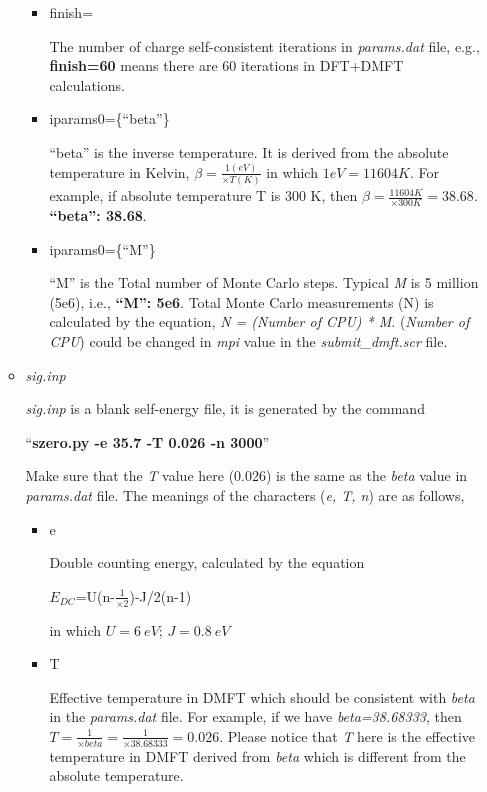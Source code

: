 \documentclass[12 pt]{article}
\begin{document}
\begin{itemize}[leftmargin=0.2in]
\begin{itemize}
	      \begin{itemize}

	      \item finish=

  The number of charge self-consistent iterations in \emph{params.dat} file, e.g., \textbf{finish=60} means there are
 60 iterations in DFT+DMFT calculations. 

	      \item iparams0=\{``beta''\}

  ``beta'' is the inverse temperature. It is derived from the absolute temperature in Kelvin, $\beta=\frac{1(eV)}
{×T(K)}$ in which $1eV=11604K$. For example, if absolute temperature T is 300 K, then $\beta=\frac{11604K}{×300K}=
38.68$. \textbf{``beta'': 38.68}.

	      \item iparams0=\{``M''\}

  ``M'' is the Total number of Monte Carlo steps. Typical \emph{M} is 5 million (5e6), i.e., \textbf{``M'': 5e6}. 
Total Monte Carlo measurements (N) is calculated by the equation, \emph{N = (Number of CPU) * M}. (\emph{Number of 
CPU}) could be changed in \emph{mpi} value in the \emph{submit\_dmft.scr} file.

	      \end{itemize}

  \cleardoublepage

	    \item \emph{sig.inp}

  \emph{sig.inp} is a blank self-energy file, it is generated by the command 

  ``\textbf{szero.py -e 35.7 -T 0.026 -n 3000}''

  Make sure that the \emph{T} value here (0.026) is the same as the \emph{beta} value in \emph{params.dat} file. The 
meanings of the characters (\emph{e, T, n}) are as follows,

	      \begin{itemize}

	      \item e

  Double counting energy, calculated by the equation

  $E_{DC}$=U(n-$\frac{1}{×2}$)-J/2(n-1) 

  in which $U=6\ eV$; $J=0.8\ eV$

	      \item T

  Effective temperature in DMFT which should be consistent with \emph{beta} in the \emph{params.dat} file. For 
example, if we have \emph{beta=38.68333}, then $T=\frac{1}{×beta}=\frac{1}{×38.68333}=0.026$. Please notice that 
\emph{T} here is the effective temperature in DMFT derived from \emph{beta} which is different from the absolute 
temperature. 


\end{itemize}
\end{itemize}
\end{itemize}
\end{document}
